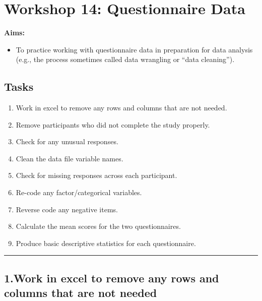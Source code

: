\documentclass[
]{book}
\providecommand{\tightlist}{%
  \setlength{\itemsep}{0pt}\setlength{\parskip}{0pt}}
\let\oldsection\section
\renewcommand{\section}{\needspace{5\baselineskip}\oldsection}
\begin{document}
\chapter{Workshop 14: Questionnaire Data}\label{workshop-14-questionnaire-data}

\textbf{Aims:}

\begin{itemize}
\tightlist
\item
  To practice working with questionnaire data in preparation for data analysis (e.g., the process sometimes called data wrangling or ``data cleaning'').
\end{itemize}

\section{\texorpdfstring{\textbf{Tasks}}{Tasks}}\label{tasks}

\begin{enumerate}
\def\labelenumi{\arabic{enumi}.}
\item
  Work in excel to remove any rows and columns that are not needed.
\item
  Remove participants who did not complete the study properly.
\item
  Check for any unusual responses.
\item
  Clean the data file variable names.
\item
  Check for missing responses across each participant.
\item
  Re-code any factor/categorical variables.
\item
  Reverse code any negative items.
\item
  Calculate the mean scores for the two questionnaires.
\item
  Produce basic descriptive statistics for each questionnaire.
\end{enumerate}

\begin{center}\rule{0.5\linewidth}{0.5pt}\end{center}

\section{\texorpdfstring{\textbf{1.Work in excel to remove any rows and columns that are not needed}}{1.Work in excel to remove any rows and columns that are not needed}}\label{work-in-excel-to-remove-any-rows-and-columns-that-are-not-needed}
\end{document}
